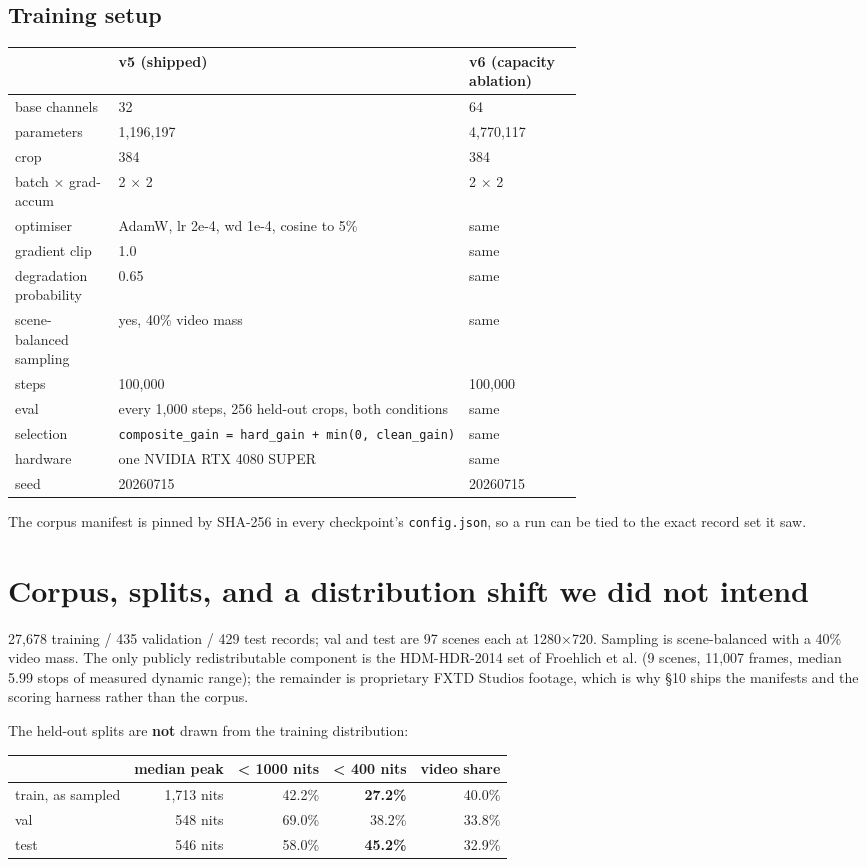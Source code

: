 \hypertarget{training-setup}{%
\subsection{Training setup}\label{training-setup}}

\begin{longtable}[]{@{}lp{0.46\linewidth}p{0.20\linewidth}@{}}
\toprule
& v5 (shipped) & v6 (capacity ablation)\tabularnewline
\midrule
\endhead
base channels & 32 & 64\tabularnewline
parameters & 1,196,197 & 4,770,117\tabularnewline
crop & 384 & 384\tabularnewline
batch × grad-accum & 2 × 2 & 2 × 2\tabularnewline
optimiser & AdamW, lr 2e-4, wd 1e-4, cosine to 5\% & same\tabularnewline
gradient clip & 1.0 & same\tabularnewline
degradation probability & 0.65 & same\tabularnewline
scene-balanced sampling & yes, 40\% video mass & same\tabularnewline
steps & 100,000 & 100,000\tabularnewline
eval & every 1,000 steps, 256 held-out crops, both conditions & same\tabularnewline
selection & \texttt{composite\_gain\ =\ hard\_gain\ +\ min(0,\ clean\_gain)} & same\tabularnewline
hardware & one NVIDIA RTX 4080 SUPER & same\tabularnewline
seed & 20260715 & 20260715\tabularnewline
\bottomrule
\end{longtable}

The corpus manifest is pinned by SHA-256 in every checkpoint's \texttt{config.json}, so
a run can be tied to the exact record set it saw.

\hypertarget{corpus-splits-and-a-distribution-shift-we-did-not-intend}{%
\section{Corpus, splits, and a distribution shift we did not intend}\label{corpus-splits-and-a-distribution-shift-we-did-not-intend}}

27,678 training / 435 validation / 429 test records; val and test are 97 scenes
each at 1280×720. Sampling is scene-balanced with a 40\% video mass. The only
publicly redistributable component is the HDM-HDR-2014 set of Froehlich et al.
\cite{froehlich2014} (9 scenes, 11,007 frames, median 5.99 stops of measured dynamic range); the
remainder is proprietary FXTD Studios footage, which is why §10 ships the
manifests and the scoring harness rather than the corpus.

The held-out splits are \textbf{not} drawn from the training distribution:

\begin{longtable}[]{@{}lrrrr@{}}
\toprule
& median peak & \textless{} 1000 nits & \textless{} 400 nits & video share\tabularnewline
\midrule
\endhead
train, as sampled & 1,713 nits & 42.2\% & \textbf{27.2\%} & 40.0\%\tabularnewline
val & 548 nits & 69.0\% & 38.2\% & 33.8\%\tabularnewline
test & 546 nits & 58.0\% & \textbf{45.2\%} & 32.9\%\tabularnewline
\bottomrule
\end{longtable}

